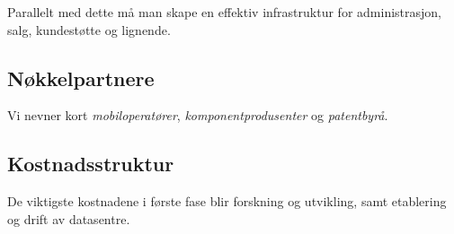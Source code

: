 Parallelt med dette må man skape en effektiv infrastruktur for administrasjon,
salg, kundestøtte og lignende.

\subsection*{Nøkkelpartnere}

Vi nevner kort \textit{mobiloperatører}, \textit{komponentprodusenter} og
\textit{patentbyrå}.

\subsection*{Kostnadsstruktur}

De viktigste kostnadene i første fase blir forskning og utvikling, samt
etablering og drift av datasentre.

